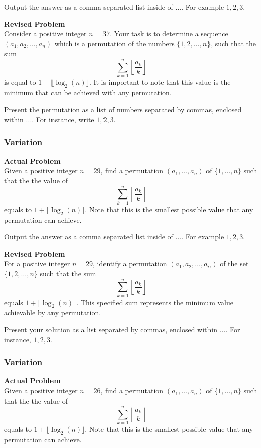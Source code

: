 Output the answer as a comma separated list inside of $\boxed{...}$. For example $\boxed{1, 2, 3}$.

\textbf{Revised Problem}\\
Consider a positive integer \( n = 37 \). Your task is to determine a sequence \((a_1, a_2, \ldots, a_n)\) which is a permutation of the numbers \(\{1, 2, \ldots, n\}\), such that the sum
\[ \sum_{k=1}^{n}\left\lfloor\frac{a_k}{k}\right\rfloor \]
is equal to \(1 + \lfloor \log_2(n) \rfloor\).
It is important to note that this value is the minimum that can be achieved with any permutation.

Present the permutation as a list of numbers separated by commas, enclosed within $\boxed{...}$. For instance, write $\boxed{1, 2, 3}$.

\subsubsection{Variation}
\textbf{Actual Problem}\\
Given a positive integer $n = 29$, find a permutation $(a_1,\dots,a_n)$ of $\{1,\dots,n\}$ such that the 
the value of 
$$ \sum_{k=1}^{n}\left\lfloor\frac{a_k}{k}\right\rfloor $$ 
equals to $1+\lfloor \log_2(n) \rfloor$.
Note that this is the smallest possible value that any permutation can achieve.


Output the answer as a comma separated list inside of $\boxed{...}$. For example $\boxed{1, 2, 3}$.

\textbf{Revised Problem}\\
For a positive integer \( n = 29 \), identify a permutation \((a_1, a_2, \ldots, a_n)\) of the set \(\{1, 2, \ldots, n\}\) such that the sum
\[ \sum_{k=1}^{n} \left\lfloor \frac{a_k}{k} \right\rfloor \]
equals \(1 + \lfloor \log_2(n) \rfloor\).
This specified sum represents the minimum value achievable by any permutation.

Present your solution as a list separated by commas, enclosed within \(\boxed{...}\). For instance, \(\boxed{1, 2, 3}\).

\subsubsection{Variation}
\textbf{Actual Problem}\\
Given a positive integer $n = 26$, find a permutation $(a_1,\dots,a_n)$ of $\{1,\dots,n\}$ such that the 
the value of 
$$ \sum_{k=1}^{n}\left\lfloor\frac{a_k}{k}\right\rfloor $$ 
equals to $1+\lfloor \log_2(n) \rfloor$.
Note that this is the smallest possible value that any permutation can achieve.


